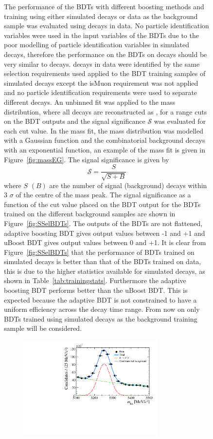 \begin{figure}[tbp]
The performance of the BDTs with different boosting methods and training using either simulated decays or data as the background sample was evaluated using \bhh decays in data. No particle identification variables were used in the input variables of the BDTs due to the poor modelling of particle identification variables in simulated decays, therefore the performance on the BDTs on \bhh decays should be very similar to \bsmumu decays. \bhh decays in data were identified by the same selection requirements used applied to the BDT training samples of simulated decays except the isMuon requirement was not applied and no particle identification requirements were used to separate different \bhh decays. An unbinned \ml fit was applied to the \bhh mass distribution, where all \bhh decays are reconstructed as \bsmumu, for a range cuts on the BDT outputs and the signal significance $\mathcal{S}$  was evaluated for each cut value. In the mass fit, the \bhh mass distribution was modelled with a Gaussian function and the combinatorial background decays with an exponential function, an example of the mass fit is given in Figure~\ref{fig:massEG}. The signal significance is given by
\begin{equation}
\mathcal{S} = \frac{S}{\sqrt{S+B}}
\label{eq:SigSigf}
\end{equation} 
where $S$ $(B)$ are the number of signal (background) decays within 3 $\sigma$ of the centre of the \bhh mass peak. 
The signal significance as a function of the cut value placed on the BDT output for the BDTs trained on the different background samples are shown in Figure~\ref{fig:SSelBDTs}. The outputs of the BDTs are not flattened, adaptive boosting BDT gives output values between -1 and +1 and uBoost BDT gives output values between 0 and +1. It is clear from Figure~\ref{fig:SSelBDTs} that the performance of BDTs trained on simulated decays is better than that of the BDTs trained on data, this is due to the higher statistics available for simulated decays, as shown in Table~\ref{tab:trainingstats}. Furthermore the adaptive boosting BDT performs better than the uBoost BDT. This is expected because the adaptive BDT is not constrained to have a uniform efficiency across the decay time range. From now on only BDTs trained using simulated decays as the background training sample will be considered.
\begin{figure}[htbp]
    \centering
        \includegraphics[width=0.8\textwidth]{./Figs/Selection/mass_example.pdf}

\end{figure}
\end{figure}
